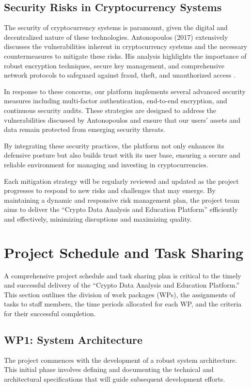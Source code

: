 \documentclass[12pt]{report}
\begin{document}
\subsection{Security Risks in Cryptocurrency Systems}
The security of cryptocurrency systems is paramount, given the digital and decentralized nature of these technologies. Antonopoulos (2017) extensively discusses the vulnerabilities inherent in cryptocurrency systems and the necessary countermeasures to mitigate these risks. His analysis highlights the importance of robust encryption techniques, secure key management, and comprehensive network protocols to safeguard against fraud, theft, and unauthorized access \cite{antonopoulos2017}.

In response to these concerns, our platform implements several advanced security measures including multi-factor authentication, end-to-end encryption, and continuous security audits. These strategies are designed to address the vulnerabilities discussed by Antonopoulos and ensure that our users' assets and data remain protected from emerging security threats.

By integrating these security practices, the platform not only enhances its defensive posture but also builds trust with its user base, ensuring a secure and reliable environment for managing and investing in cryptocurrencies.

Each mitigation strategy will be regularly reviewed and updated as the project progresses to respond to new risks and challenges that may emerge. By maintaining a dynamic and responsive risk management plan, the project team aims to deliver the ``Crypto Data Analysis and Education Platform'' efficiently and effectively, minimizing disruptions and maximizing quality.

\section{Project Schedule and Task Sharing}
A comprehensive project schedule and task sharing plan is critical to the timely and successful delivery of the ``Crypto Data Analysis and Education Platform.'' This section outlines the division of work packages (WPs), the assignments of tasks to staff members, the time periods allocated for each WP, and the criteria for their successful completion.

\subsection{WP1: System Architecture}
The project commences with the development of a robust system architecture. This initial phase involves defining and documenting the technical and architectural specifications that will guide subsequent development efforts.
\end{document}
